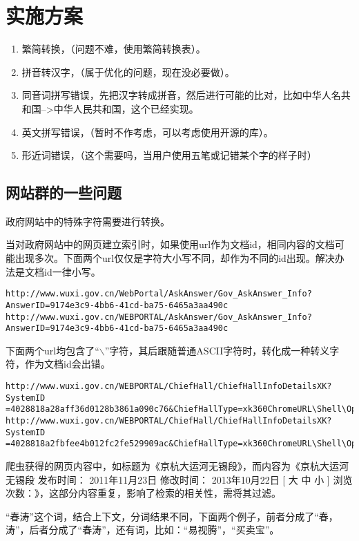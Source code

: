\section{实施方案}
\begin{enumerate}[(1)]
\item 繁简转换，（问题不难，使用繁简转换表）。
\item 拼音转汉字，（属于优化的问题，现在没必要做）。
\item 同音词拼写错误，先把汉字转成拼音，然后进行可能的比对，比如中华人名共和国-->中华人民共和国，这个已经实现。
\item 英文拼写错误，（暂时不作考虑，可以考虑使用开源的库）。
\item 形近词错误，（这个需要吗，当用户使用五笔或记错某个字的样子时）
\end{enumerate}
\subsection{网站群的一些问题}
\par 政府网站中的特殊字符需要进行转换。
\par 当对政府网站中的网页建立索引时，如果使用url作为文档id，相同内容的文档可能出现多次。下面两个url仅仅是字符大小写不同，却作为不同的id出现。解决办法是文档id一律小写。
\begin{verbatim}
http://www.wuxi.gov.cn/WebPortal/AskAnswer/Gov_AskAnswer_Info?
AnswerID=9174e3c9-4bb6-41cd-ba75-6465a3aa490c
http://www.wuxi.gov.cn/WEBPORTAL/AskAnswer/Gov_AskAnswer_Info?
AnswerID=9174e3c9-4bb6-41cd-ba75-6465a3aa490c
\end{verbatim}
\par 下面两个url均包含了“$\backslash$”字符，其后跟随普通ASCII字符时，转化成一种转义字符，作为文档id会出错。
\begin{verbatim}
http://www.wuxi.gov.cn/WEBPORTAL/ChiefHall/ChiefHallInfoDetailsXK?SystemID
=4028818a28aff36d0128b3861a090c76&ChiefHallType=xk360ChromeURL\Shell\Open\Command
http://www.wuxi.gov.cn/WEBPORTAL/ChiefHall/ChiefHallInfoDetailsXK?SystemID
=4028818a2fbfee4b012fc2fe529909ac&ChiefHallType=xk360ChromeURL\Shell\Open\Command
\end{verbatim}
\par 爬虫获得的网页内容中，如标题为《京杭大运河无锡段》，而内容为《京杭大运河无锡段 发布时间： 2011年11月23日 修改时间： 2013年10月22日 [ 大 中 小 ] 浏览次数：》，这部分内容重复，影响了检索的相关性，需将其过滤。
\par “春涛”这个词，结合上下文，分词结果不同，下面两个例子，前者分成了“春，涛”，后者分成了“春涛”，还有词，比如：“易视腾”，“买卖宝”。
